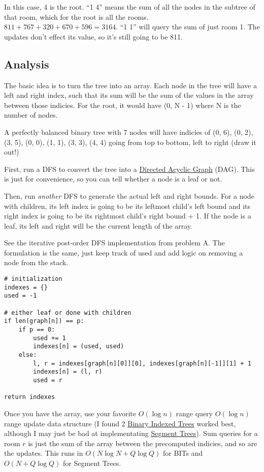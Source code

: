 \documentclass[11pt, oneside]{article}
\begin{document}
In this case, 4 is the root. ``1 4'' means the sum of all the nodes in the subtree of that room,
which for the root is all the rooms. \( 811 + 767 + 320 + 670 + 596 = 3164 \).
``1 1'' will query the sum of just room 1. The updates don't effect its value,
so it's still going to be 811.

\subsection{Analysis}

The basic idea is to turn the tree into an array. Each node in the tree will have a left and right index,
such that its sum will be the sum of the values in the array between those indicies.
For the root, it would have (0, N - 1) where N is the number of nodes.

A perfectly balanced binary tree with 7 nodes will have indicies of (0, 6),
(0, 2), (3, 5), (0, 0), (1, 1), (3, 3), (4, 4) going from top to bottom, left to right
(draw it out!)

First, run a DFS to convert the tree into a \href{https://en.wikipedia.org/wiki/Directed_acyclic_graph}{Directed Acyclic Graph} (DAG). This is just for convenience,
so you can tell whether a node is a leaf or not.

Then, run \textit{another} DFS to generate the actual left and right bounds.
For a node with children, its left index is going to be its leftmost child's left bound
and its right index is going to be its rightmost child's right bound + 1.
If the node is a leaf, its left and right will be the current length of the array.

See the iterative post-order DFS implementation from problem A.
The formulation is the same, just keep track of used and add logic on removing a node from the stack.

\newpage

\begin{verbatim}
# initialization
indexes = {}
used = -1

# either leaf or done with children
if len(graph[n]) == p:
    if p == 0:
        used += 1
        indexes[n] = (used, used)
    else:
        l, r = indexes[graph[n][0]][0], indexes[graph[n][-1]][1] + 1
        indexes[n] = (l, r)
        used = r

return indexes
\end{verbatim}

Once you have the array, use your favorite \( O(\log n) \) range query
\( O(\log n) \) range update data structure (I found 2 \href{https://activities.tjhsst.edu/sct/lectures/1920/2019_11_01_Binary_Index_Trees.pdf}{Binary Indexed Trees} worked best, although I may just be bad at implementating \href{https://activities.tjhsst.edu/sct/lectures/1920/2019_11_15_Segment_Trees.pdf}{Segment Trees}). Sum queries for a room \( r \) is
just the sum of the array between the precomputed indicies, and so
are the updates. This runs in \( O(N \log N + Q \log Q) \) for BITs and \( O(N + Q \log Q) \) for Segment Trees.
\end{document}
